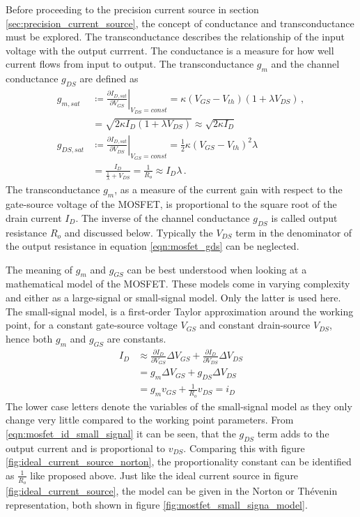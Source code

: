 Before proceeding to the precision current source in section \ref{sec:precision_current_source}, the concept of conductance and transconductance must be explored. The transconductance describes the relationship of the input voltage with the output currrent. The conductance is a measure for how well current flows from input to output. The transconductance $g_m$ and the channel conductance $g_{DS}$ are defined as
\begin{align}
    g_{m, sat} &\coloneqq \left. \frac{\partial I_{D,sat}}{\partial V_{GS}} \right|_{V_{DS} = const} = \kappa \left(V_{GS} - V_{th} \right) (1 + \lambda V_{DS}) \, , \label{eqn:mosfet_gm}\\
    &= \sqrt{2 \kappa I_D \left(1+ \lambda V_{DS}\right)} \approx \sqrt{2 \kappa I_D} \label{eqn:mosfet_gm_approximation} \\
    g_{DS, sat} &\coloneqq \left. \frac{\partial I_{D,sat}}{\partial V_{DS}} \right|_{V_{GS} = const} = \frac{1}{2} \kappa \left(V_{GS} - V_{th} \right)^2 \lambda\\
    &= \frac{I_D}{\frac{1}{\lambda} + V_{DS}} = \frac{1}{R_o} \approx I_D \lambda \label{eqn:mosfet_gds}\,.
\end{align}
The transconductance $g_m$, as a measure of the current gain with respect to the gate-source voltage of the MOSFET, is proportional to the square root of the drain current $I_D$. The inverse of the channel conductance $g_{DS}$ is called output resistance $R_o$ and discussed below. Typically the $V_{DS}$ term in the denominator of the output resistance in equation \ref{eqn:mosfet_gds} can be neglected.

The meaning of $g_{m}$ and $g_{GS}$ can be best understood when looking at a mathematical model of the MOSFET. These models come in varying complexity and either as a large-signal or small-signal model. Only the latter is used here. The small-signal model, is a first-order Taylor approximation around the working point, for a constant gate-source voltage $V_{GS}$ and constant drain-source $V_{DS}$, hence both $g_{m}$ and $g_{GS}$ are constants.
\begin{align}
    I_D &\approx \frac{\partial I_D}{\partial V_{GS}} \Delta V_{GS} + \frac{\partial I_D}{\partial V_{DS}} \Delta V_{DS}\\
    &= g_{m} \Delta V_{GS} + g_{DS} \Delta V_{DS}\\
    &= g_{m} v_{GS} + \frac{1}{R_o} v_{DS} = i_D \label{eqn:mosfet_id_small_signal}
\end{align}
The lower case letters denote the variables of the small-signal model as they only change very little compared to the working point parameters.
From \ref{eqn:mosfet_id_small_signal} it can be seen, that the $g_{DS}$ term adds to the output current and is proportional to $v_{DS}$. Comparing this with figure \ref{fig:ideal_current_source_norton}, the proportionality constant can be identified as $\frac{1}{R_o}$ like proposed above. Just like the ideal current source in figure \ref{fig:ideal_current_source}, the model can be given in the Norton or Thévenin representation, both shown in figure \ref{fig:mostfet_small_signa_model}.

